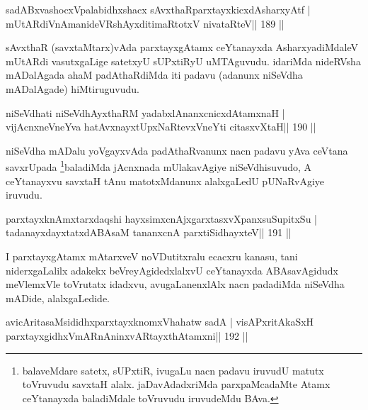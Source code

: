 
\begin{shl}
sadABxvashocxVpalabidhxshacx sAvxthaRparxtayxkicxdAsharxyAtf |
mUtARdiVnAmanideVRshAyxditimaRtotxV nivataRteV\hfill || 189 ||
\end{shl}

\begin{artha}
sAvxthaR (savxtaMtarx)vAda parxtayxgAtamx ceYtanayxda AsharxyadiMdaleV mUtARdi vasutxgaLige satetxyU sUPxtiRyU uMTAguvudu. idariMda nideRVsha mADalAgada ahaM padAthaRdiMda iti padavu (adanunx niSeVdha mADalAgade) hiMtiruguvudu.
\end{artha}

\begin{shl}
niSeVdhati niSeVdhAyxthaRM yadabxlAnanxcnicxdAtamxnaH |
vijAcnxneVneYva hatAvx\s nayxtUpxNaRtevxVneYti citasxvXtaH\hfill || 190 ||
\end{shl}

\begin{artha}
niSeVdha mADalu yoVgayxvAda padAthaRvanunx nacn padavu yAva ceVtana savxrUpada  \footnote{balaveMdare satetx, sUPxtiR, ivugaLu nacn padavu iruvudU matutx toVruvudu savxtaH alalx. jaDavAdadxriMda parxpaMcadaMte Atamx ceYtanayxda baladiMdale toVruvudu iruvudeMdu BAva.}baladiMda jAcnxnada mUlakavAgiye niSeVdhisuvudo, A ceYtanayxvu savxtaH tAnu matotxMdanunx alalxgaLedU pUNaRvAgiye iruvudu.
\end{artha}


\begin{shl}
parxtayxknAmxtarxdaqshi hayxsimxcnAjxgarxtasxvXpanxsuSupitxSu |
tadanayxdayxtatxdABAsaM tananxcnA parxtiSidhayxteV\hfill || 191 ||
\end{shl}

\begin{artha}
I parxtayxgAtamx mAtarxveV noVDutitxralu ecacxru kanasu, tani niderxgaLalilx adakekx beVreyAgidedxlalxvU ceYtanayxda ABAsavAgidudx meVlemxVle toVrutatx idadxvu, avugaLanenxlAlx nacn padadiMda niSeVdha mADide, alalxgaLedide.
\end{artha}

\begin{shl}
avicAritasaMsididhxparxtayxknomxVhahatw sadA |
visAPxritAkaSxH parxtayxgidhxVmARnAninxvARtayxthA\s\s tamxni\hfill || 192 ||
\end{shl}

